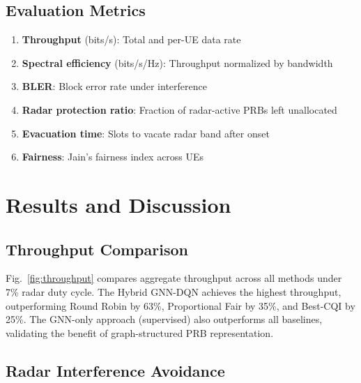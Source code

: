 \documentclass[conference]{IEEEtran}
\begin{document}
\subsection{Evaluation Metrics}

\begin{enumerate}
    \item \textbf{Throughput} (bits/s): Total and per-UE data rate
    \item \textbf{Spectral efficiency} (bits/s/Hz): Throughput normalized by bandwidth
    \item \textbf{BLER}: Block error rate under interference
    \item \textbf{Radar protection ratio}: Fraction of radar-active PRBs left unallocated
    \item \textbf{Evacuation time}: Slots to vacate radar band after onset
    \item \textbf{Fairness}: Jain's fairness index across UEs
\end{enumerate}

\section{Results and Discussion}

\subsection{Throughput Comparison}

Fig.~\ref{fig:throughput} compares aggregate throughput across all methods under 7\% radar duty cycle. The Hybrid GNN-DQN achieves the highest throughput, outperforming Round Robin by 63\%, Proportional Fair by 35\%, and Best-CQI by 25\%. The GNN-only approach (supervised) also outperforms all baselines, validating the benefit of graph-structured PRB representation.


\subsection{Radar Interference Avoidance}
\end{document}
